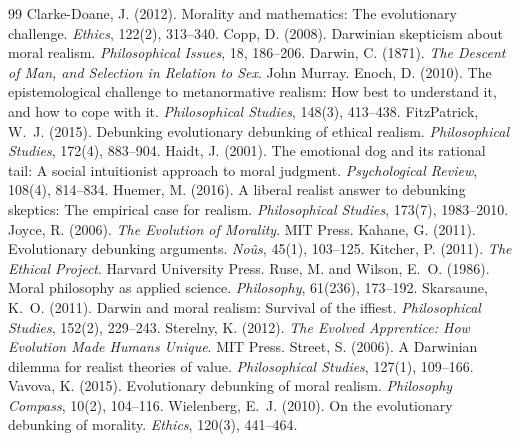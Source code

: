 \documentclass{situationist-preprint}
\begin{document}
\begin{thebibliography}{99}\small
{} Clarke-Doane, J. (2012). Morality and mathematics: The evolutionary challenge. \emph{Ethics}, 122(2), 313--340.
 Copp, D. (2008). Darwinian skepticism about moral realism. \emph{Philosophical Issues}, 18, 186--206.
 Darwin, C. (1871). \emph{The Descent of Man, and Selection in Relation to Sex}. John Murray.
 Enoch, D. (2010). The epistemological challenge to metanormative realism: How best to understand it, and how to cope with it. \emph{Philosophical Studies}, 148(3), 413--438.
 FitzPatrick, W.~J. (2015). Debunking evolutionary debunking of ethical realism. \emph{Philosophical Studies}, 172(4), 883--904.
 Haidt, J. (2001). The emotional dog and its rational tail: A social intuitionist approach to moral judgment. \emph{Psychological Review}, 108(4), 814--834.
 Huemer, M. (2016). A liberal realist answer to debunking skeptics: The empirical case for realism. \emph{Philosophical Studies}, 173(7), 1983--2010.
 Joyce, R. (2006). \emph{The Evolution of Morality}. MIT Press.
 Kahane, G. (2011). Evolutionary debunking arguments. \emph{No\^us}, 45(1), 103--125.
 Kitcher, P. (2011). \emph{The Ethical Project}. Harvard University Press.
 Ruse, M. and Wilson, E.~O. (1986). Moral philosophy as applied science. \emph{Philosophy}, 61(236), 173--192.
 Skarsaune, K.~O. (2011). Darwin and moral realism: Survival of the iffiest. \emph{Philosophical Studies}, 152(2), 229--243.
 Sterelny, K. (2012). \emph{The Evolved Apprentice: How Evolution Made Humans Unique}. MIT Press.
 Street, S. (2006). A Darwinian dilemma for realist theories of value. \emph{Philosophical Studies}, 127(1), 109--166.
 Vavova, K. (2015). Evolutionary debunking of moral realism. \emph{Philosophy Compass}, 10(2), 104--116.
 Wielenberg, E.~J. (2010). On the evolutionary debunking of morality. \emph{Ethics}, 120(3), 441--464.
\end{thebibliography}
\end{document}

